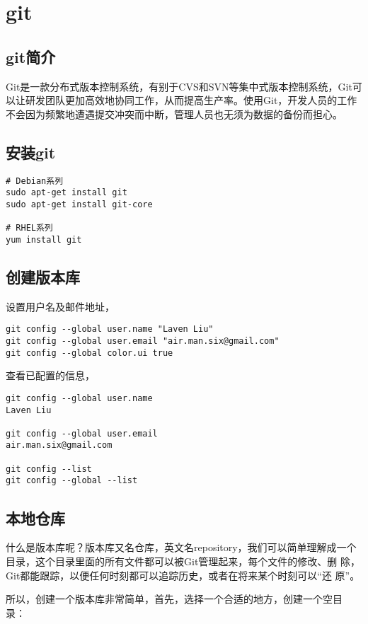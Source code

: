 \chapter{git}

\section{git简介}

Git是一款分布式版本控制系统，有别于CVS和SVN等集中式版本控制系统，Git可
以让研发团队更加高效地协同工作，从而提高生产率。使用Git，开发人员的工作
不会因为频繁地遭遇提交冲突而中断，管理人员也无须为数据的备份而担心。

\section{安装git}

\begin{verbatim}
# Debian系列
sudo apt-get install git
sudo apt-get install git-core

# RHEL系列
yum install git
\end{verbatim}

\section{创建版本库}
设置用户名及邮件地址，
\begin{verbatim}
git config --global user.name "Laven Liu"
git config --global user.email "air.man.six@gmail.com"
git config --global color.ui true
\end{verbatim}

查看已配置的信息，
\begin{verbatim}
git config --global user.name
Laven Liu

git config --global user.email
air.man.six@gmail.com

git config --list
git config --global --list
\end{verbatim}

\section{本地仓库}

什么是版本库呢？版本库又名仓库，英文名repository，我们可以简单理解成一个
目录，这个目录里面的所有文件都可以被Git管理起来，每个文件的修改、删
除，Git都能跟踪，以便任何时刻都可以追踪历史，或者在将来某个时刻可以“还
原”。

所以，创建一个版本库非常简单，首先，选择一个合适的地方，创建一个空目
录：

